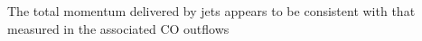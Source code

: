 \documentclass[12pt]{mythesis}
\begin{document}
The total momentum delivered by jets appears to be consistent with that measured in the associated CO outflows \citep{hartigan1994, eisloffel1997}

\end{document}
